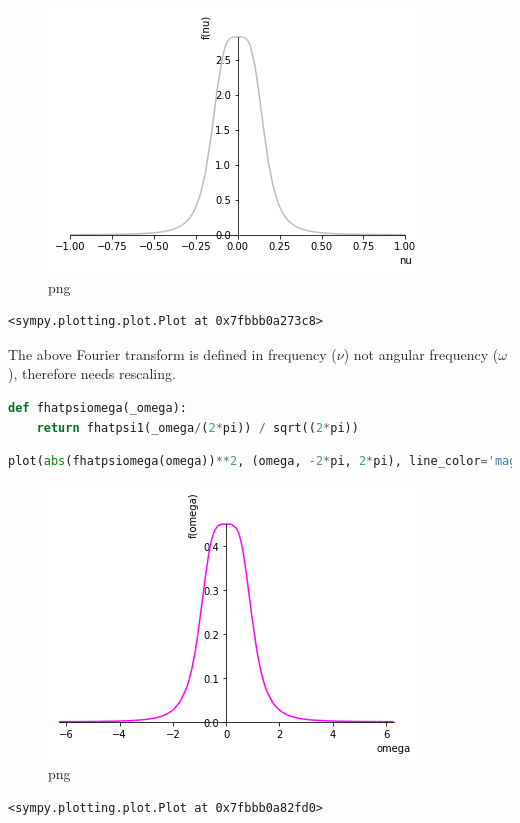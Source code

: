 \begin{figure}
\centering
\includegraphics[width=0.66\linewidth]{output_56_0.png}
\caption{png}
\end{figure}

\begin{lstlisting}
<sympy.plotting.plot.Plot at 0x7fbbb0a273c8>
\end{lstlisting}

The above Fourier transform is defined in frequency ($\nu$) not angular
frequency ($\omega$), therefore needs rescaling.

\begin{lstlisting}[language=Python]
def fhatpsiomega(_omega):
    return fhatpsi1(_omega/(2*pi)) / sqrt((2*pi))
\end{lstlisting}

\begin{lstlisting}[language=Python]
plot(abs(fhatpsiomega(omega))**2, (omega, -2*pi, 2*pi), line_color='magenta')
\end{lstlisting}

\begin{figure}
\centering
\includegraphics[width=0.66\linewidth]{output_59_0.png}
\caption{png}
\end{figure}

\begin{lstlisting}
<sympy.plotting.plot.Plot at 0x7fbbb0a82fd0>
\end{lstlisting}

